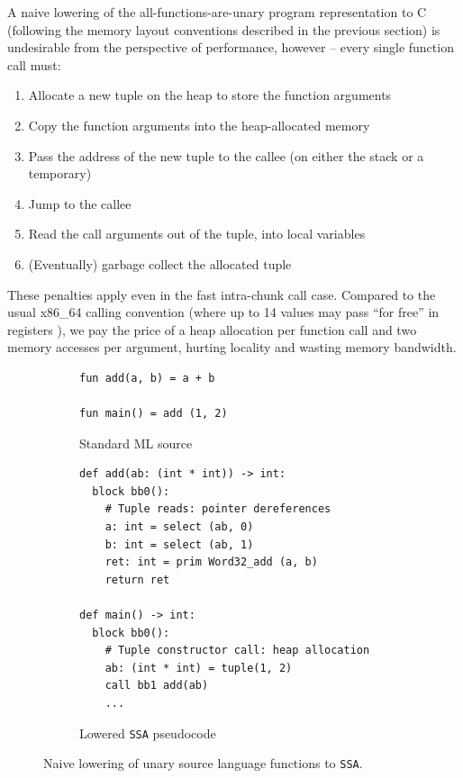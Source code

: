 A naive lowering of the all-functions-are-unary program representation to C
(following the memory layout conventions described in the previous section) is
undesirable from the perspective of performance, however -- every single
function call must:
\begin{enumerate}[noitemsep, topsep=2pt, midpenalty=10000]
\item Allocate a new tuple on the heap to store the function arguments
\item Copy the function arguments into the heap-allocated memory
\item Pass the address of the new tuple to the callee (on either the stack or a temporary)
\item Jump to the callee
\item Read the call arguments out of the tuple, into local variables
\item (Eventually) garbage collect the allocated tuple
\end{enumerate}

{
These penalties apply even in the fast intra-chunk call case. Compared to the
usual x86\_64 calling convention (where up to 14 values may pass ``for free'' in
registers \citep{amd64-abi}), we pay the price of a heap allocation per function
call and two memory accesses per argument, hurting locality and wasting memory
bandwidth.\par}

\begin{figure}[htbp]
  \centering
  \begin{subfigure}[t]{0.33\textwidth}
    \caption{Standard ML source}
    \label{fig:add_two_sml}
    \vspace{1mm}
\begin{verbatim}
fun add(a, b) = a + b

fun main() = add (1, 2)
\end{verbatim}
  \end{subfigure}\hfill
  \begin{subfigure}[t]{0.64\textwidth}
    \caption{Lowered \texttt{SSA} pseudocode}
    \label{fig:add_two_ssa}
    \vspace{1mm}
\begin{verbatim}
def add(ab: (int * int)) -> int:
  block bb0():
    # Tuple reads: pointer dereferences
    a: int = select (ab, 0)
    b: int = select (ab, 1)
    ret: int = prim Word32_add (a, b)
    return ret

def main() -> int:
  block bb0():
    # Tuple constructor call: heap allocation
    ab: (int * int) = tuple(1, 2)
    call bb1 add(ab)
    ...
\end{verbatim}
  \end{subfigure}
  \caption{Naive lowering of unary source language functions to \texttt{SSA}.}
  \label{fig:add_two_compare}
\end{figure}


